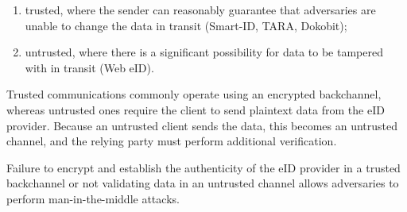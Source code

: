 \begin{enumerate}
    \item trusted, where the sender can reasonably guarantee that adversaries are unable to change the data in transit (Smart-ID, TARA, Dokobit);
    \item untrusted, where there is a significant possibility for data to be tampered with in transit (Web eID).
\end{enumerate}

Trusted communications commonly operate using an encrypted backchannel, whereas untrusted ones require the client to send plaintext data from the eID provider. Because an untrusted client sends the data, this becomes an untrusted channel, and the relying party must perform additional verification.

Failure to encrypt and establish the authenticity of the eID provider in a trusted backchannel or not validating data in an untrusted channel allows adversaries to perform man-in-the-middle attacks.